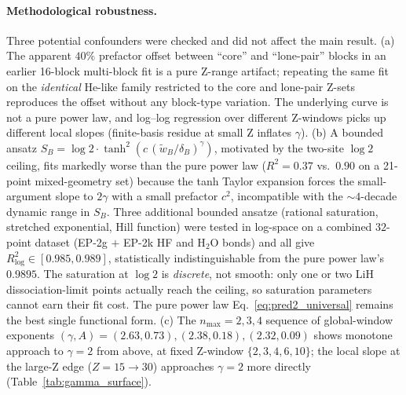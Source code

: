 \documentclass[twocolumn,pra,amsmath,amssymb,superscriptaddress]{revtex4-2}
\begin{document}
\paragraph*{Methodological robustness.}  Three potential
confounders were checked and did not affect the main result.
(a) The apparent $40\%$ prefactor offset between ``core'' and
``lone-pair'' blocks in an earlier 16-block multi-block fit is a
pure Z-range artifact; repeating the same fit on the
\emph{identical} He-like family restricted to the core and
lone-pair Z-sets reproduces the offset without any block-type
variation.  The underlying curve is not a pure power law, and
log--log regression over different Z-windows picks up different
local slopes (finite-basis residue at small Z inflates
$\gamma$).  (b) A bounded ansatz
$S_B = \log 2 \cdot \tanh^{2}(c\,(\tilde{w}_B/\delta_B)^{\gamma})$,
motivated by the two-site $\log 2$ ceiling, fits markedly worse
than the pure power law ($R^{2}=0.37$ vs.\ $0.90$ on a
21-point mixed-geometry set) because the tanh Taylor expansion
forces the small-argument slope to $2\gamma$ with a small
prefactor $c^{2}$, incompatible with the $\sim 4$-decade
dynamic range in $S_B$.  Three additional bounded ansatze
(rational saturation, stretched exponential, Hill function)
were tested in log-space on a combined $32$-point dataset
(EP-2g $+$ EP-2k HF and H$_2$O bonds) and all give
$R^{2}_{\mathrm{log}} \in [0.985, 0.989]$, statistically
indistinguishable from the pure power law's $0.9895$.  The
saturation at $\log 2$ is \emph{discrete}, not smooth: only
one or two LiH dissociation-limit points actually reach the
ceiling, so saturation parameters cannot earn their fit cost.
The pure power law Eq.~\eqref{eq:pred2_universal} remains the
best single functional form.  (c) The $n_{\max}=2,3,4$ sequence of
global-window exponents $(\gamma, A) = (2.63, 0.73),
(2.38, 0.18), (2.32, 0.09)$ shows monotone approach to $\gamma=2$
from above, at fixed Z-window $\{2,3,4,6,10\}$; the local slope
at the large-Z edge ($Z=15\to 30$) approaches $\gamma=2$ more
directly (Table~\ref{tab:gamma_surface}).
\end{document}
